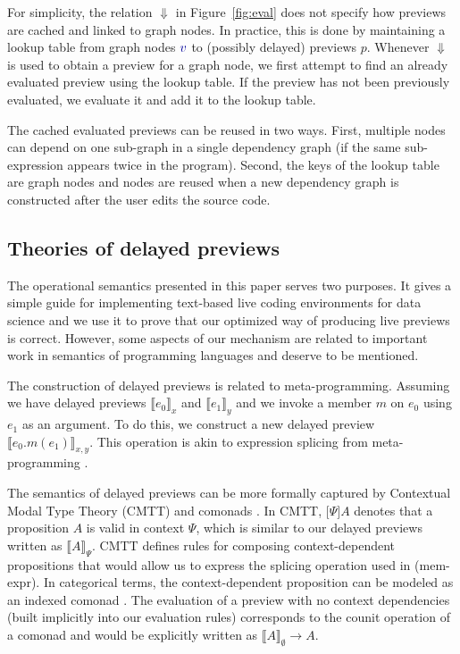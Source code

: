 \documentclass[acmsmall,anonymous,fleqn]{acmart}\settopmatter{printfolios=false,printccs=false,printacmref=false}
\theoremstyle{plain}
\theoremstyle{definition}
\newcommand{\bndclr}[1]{\textcolor{kvdclr}{#1}}
\newcommand{\rname}[1]{{\sffamily\small(#1)}}
\begin{document}
For simplicity, the relation $\Downarrow$ in Figure~\ref{fig:eval} does not specify how previews
are cached and linked to graph nodes. In practice, this is done by maintaining a lookup table
from graph nodes $\bndclr{v}$ to (possibly delayed) previews $p$.
Whenever $\Downarrow$ is used to obtain a preview for a graph node, we first
attempt to find an already evaluated preview using the lookup table. If the preview has not
been previously evaluated, we evaluate it and add it to the lookup table.

The cached evaluated previews can be reused in two ways. First, multiple nodes can
depend on one sub-graph in a single dependency graph (if the same sub-expression appears
twice in the program). Second, the keys of the lookup table are graph nodes and nodes are
reused when a new dependency graph is constructed after the user edits the source code.

\subsection{Theories of delayed previews}
The operational semantics presented in this paper serves two purposes. It gives a simple guide
for implementing text-based live coding environments for data science and we use it to prove that
our optimized way of producing live previews is correct. However, some aspects of our mechanism
are related to important work in semantics of programming languages and deserve to be mentioned.

The construction of delayed previews is related to meta-programming. Assuming
we have delayed previews $\llbracket e_0 \rrbracket_x$ and $\llbracket e_1 \rrbracket_y$ and
we invoke a member $m$ on $e_0$ using $e_1$ as an argument. To do this, we construct a new
delayed preview $\llbracket e_0.m(e_1) \rrbracket_{x, y}$. This operation is akin to expression
splicing from meta-programming \cite{metaml,quotations}.

The semantics of delayed previews can be more formally captured by Contextual Modal Type Theory
(CMTT) \cite{cmtt} and comonads \cite{cmtt-denotation}. In CMTT, $\lbrack \Psi \rbrack A$ denotes
that a proposition $A$ is valid in context $\Psi$, which is similar to our delayed previews written
as $\llbracket A \rrbracket_\Psi$. CMTT defines rules for composing context-dependent propositions
that would allow us to express the splicing operation used in \rname{mem-expr}. In categorical
terms, the context-dependent proposition can be modeled as an indexed comonad \cite{effectrev,graded}.
The evaluation of a preview with no context dependencies (built implicitly into our evaluation rules)
corresponds to the counit operation of a comonad and would be explicitly written as
$\llbracket A \rrbracket_\emptyset \rightarrow A$.
\end{document}
